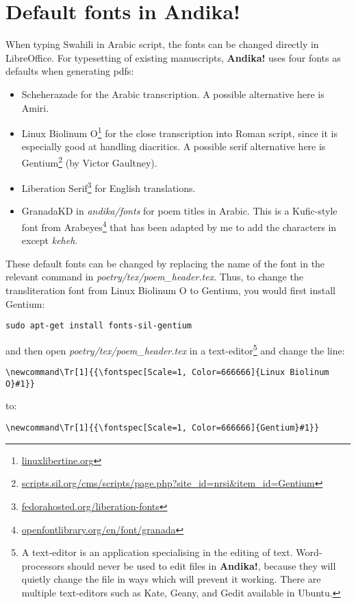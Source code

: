 \section{Default fonts in \textbf{Andika!}}
\label{s:changefont}

When typing Swahili in Arabic script, the fonts can be changed directly in LibreOffice.  For typesetting of existing manuscripts,  \textbf{Andika!} uses four fonts as defaults when generating pdfs:
\begin{itemize}
\item Scheherazade for the Arabic transcription.  A possible alternative here is Amiri.
\item Linux Biolinum O\footnote{\url{linuxlibertine.org}} for the close transcription into Roman script, since it is especially good at handling diacritics.  A possible serif alternative here is Gentium\footnote{\url{scripts.sil.org/cms/scripts/page.php?site_id=nrsi&item_id=Gentium}} (by Victor Gaultney).
\item Liberation Serif\footnote{\url{fedorahosted.org/liberation-fonts}} for English translations.
\item GranadaKD in \textit{andika/fonts} for poem titles in Arabic.  This is a Kufic-style font from Arabeyes\footnote{\url{openfontlibrary.org/en/font/granada}} that has been adapted by me to add the characters in  except \textit{keheh}.
\end{itemize}

These default fonts can be changed by replacing the name of the font in the relevant command in \textit{poetry/tex/poem\_header.tex}.  Thus, to change the transliteration font from Linux Biolinum O to Gentium, you would first install Gentium:

\verb|sudo apt-get install fonts-sil-gentium|

and then open \textit{poetry/tex/poem\_header.tex} in a text-editor\footnote{A text-editor is an application specialising in the editing of text.  Word-processors should never be used to edit files in \textbf{Andika!}, because they will quietly change the file in ways which will prevent it working.  There are multiple text-editors such as Kate, Geany, and Gedit available in Ubuntu.} and change the line:

\verb|\newcommand\Tr[1]{{\fontspec[Scale=1, Color=666666]{Linux Biolinum O}#1}}|

to:

\verb|\newcommand\Tr[1]{{\fontspec[Scale=1, Color=666666]{Gentium}#1}}|

